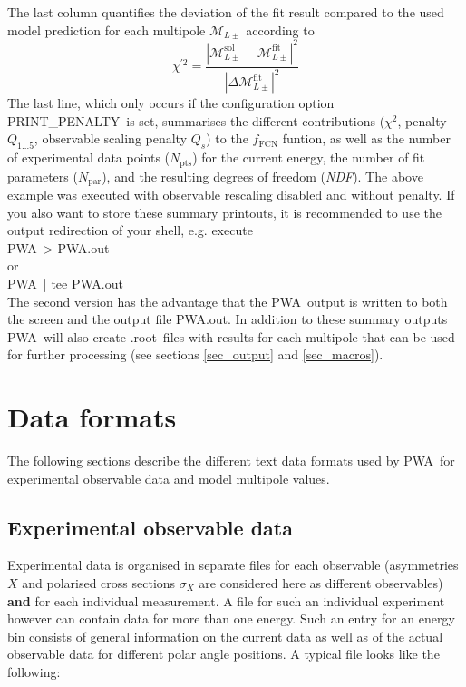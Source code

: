 \documentclass[a4paper,10pt]{article}
\def\PWA{\ttfamily PWA\rmfamily\ }
\def\tt{\ttfamily}
\def\rm{\rmfamily}
\begin{document}
The last column quantifies the deviation of the fit result compared to the used model prediction 
for each multipole $\mathcal{M}_{L\pm}$ according to
\begin{displaymath}
 \chi^{\prime2} = \frac{|\mathcal{M}_{L\pm}^\mathrm{sol} - \mathcal{M}_{L\pm}^\mathrm{fit}|^2}{|\Delta\mathcal{M}_{L\pm}^\mathrm{fit}|^2}
\end{displaymath}
The last line, which only occurs if the configuration option \tt PRINT\_PENALTY\rm\ is set, summarises
the different contributions ($\chi^2$, penalty $Q_{1...5}$, observable scaling penalty $Q_s$)
to the $f_\mathrm{FCN}$ funtion, as well as the number of experimental data points ($N_\mathrm{pts}$) for the current energy,
the number of fit parameters ($N_\mathrm{par}$), and the resulting degrees of freedom (\textit{NDF}).
The above example was executed with observable rescaling disabled and without penalty.
If you also want to store these summary printouts, it is recommended to use the output redirection of your shell, e.g. 
execute\\
\PWA \tt [\textit{PWA.cfg}] > PWA.out \rm \\
or\\
\PWA \tt [\textit{PWA.cfg}]  | tee PWA.out \rm \\
The second version has the advantage that the \PWA output is written to both the screen and the output file \tt PWA.out\rm.
In addition to these summary outputs \PWA will also create \tt.root\rm\ files with results for each multipole that can be used
for further processing (see sections \ref{sec_output} and \ref{sec_macros}).

\section{Data formats}

The following sections describe the different text data formats used by \PWA for experimental observable data and model multipole values. 

\subsection{Experimental observable data}

Experimental data is organised in separate files for each observable (asymmetries $X$ and polarised cross sections $\sigma_X$
are considered here as different observables) \textbf{and} for each individual measurement. A file for such an individual experiment
however can contain data for more than one energy.
Such an entry for an energy bin consists of general information on the current data as well as of the actual observable data
for different polar angle positions. A typical file looks like the following:\\
\end{document}
